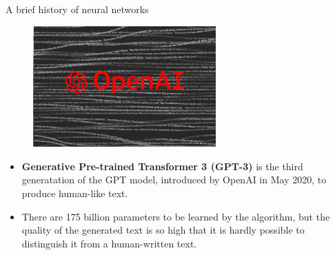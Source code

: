 \begin{vbframe}{A brief history of neural networks}
\begin{figure}
\centering
\includegraphics[width=7cm]{figure/gpt3.png}
\end{figure}
\footnotesize
\begin{itemize}
\item\textbf{Generative Pre-trained Transformer 3 (GPT-3)} is the third generatation of the GPT model, introduced by OpenAI in May 2020, to produce human-like text.
\vspace{.1cm}
\item There are 175 billion parameters to be learned by the algorithm, but the quality of the generated text is so high that it is hardly possible to distinguish it from a human-written text.
\end{itemize}
\end{vbframe}

\endlecture

